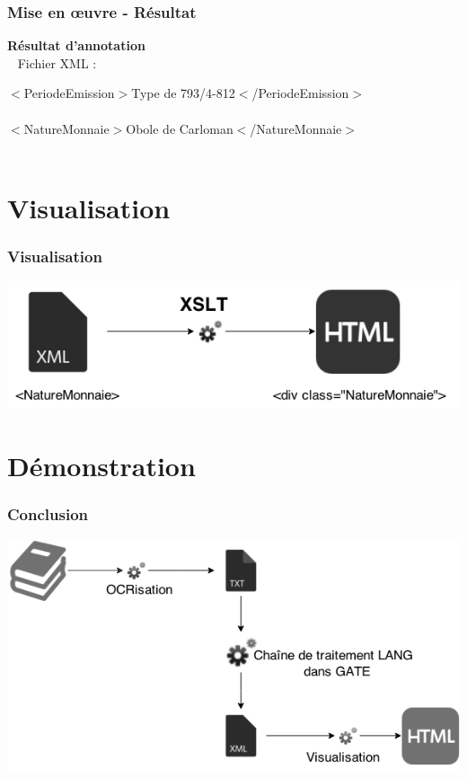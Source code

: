 \documentclass[10pt, compress]{beamer}
\begin{document}
\begin{frame}[fragile]
  \frametitle{Mise en œuvre - Résultat}
\textbf{Résultat d'annotation}\\~
Fichier XML : \\
\begin{center}
\alert{$<$PeriodeEmission$>$}Type de 793/4-812\alert{$<$/PeriodeEmission$>$}\\~\\
\alert{$<$NatureMonnaie$>$}Obole de Carloman\alert{$<$/NatureMonnaie$>$}\\~\\
\end{center}
\hfill{}

\end{frame}
\section{Visualisation}
\begin{frame}[fragile]
  \frametitle{Visualisation}
\begin{center}
\includegraphics[scale=.5]{img/visualisation.png} 
\end{center}
\end{frame}
\section{Démonstration}
\begin{frame}[fragile]
  \frametitle{Conclusion}
\begin{center}
\includegraphics[scale=0.5]{img/conclusion.png}
\end{center}
\end{frame}
\end{document}
